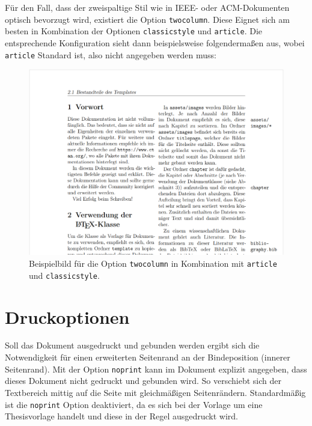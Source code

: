 
Für den Fall, dass der zweispaltige Stil wie in IEEE- oder ACM-Dokumenten optisch bevorzugt wird, existiert die Option \texttt{twocolumn}. Diese Eignet sich am besten in Kombination der Optionen \texttt{classicstyle} und \texttt{article}. Die entsprechende Konfiguration sieht dann beispielsweise folgendermaßen aus, wobei \texttt{article} Standard ist, also nicht angegeben werden muss:


\begin{showcase}
    \tcblower
    \begin{figure}[H]
        \centering
        \includegraphics[width=0.8\columnwidth]{assets/images/klassenoptionen/twocolumn_classicstyle_article.png}
        \caption{Beispielbild für die Option \texttt{twocolumn} in Kombination mit \texttt{article} und \texttt{classicstyle}.}
    \end{figure}
\end{showcase}

\section{Druckoptionen}
Soll das Dokument ausgedruckt und gebunden werden ergibt sich die Notwendigkeit für einen erweiterten Seitenrand an der Bindeposition (innerer Seitenrand). Mit der Option \texttt{noprint} kann im Dokument explizit angegeben, dass dieses Dokument nicht gedruckt und gebunden wird. So verschiebt sich der Textbereich mittig auf die Seite mit gleichmäßigen Seitenrändern. Standardmäßig ist die \texttt{noprint} Option deaktiviert, da es sich bei der Vorlage um eine Thesisvorlage handelt und diese in der Regel ausgedruckt wird.

